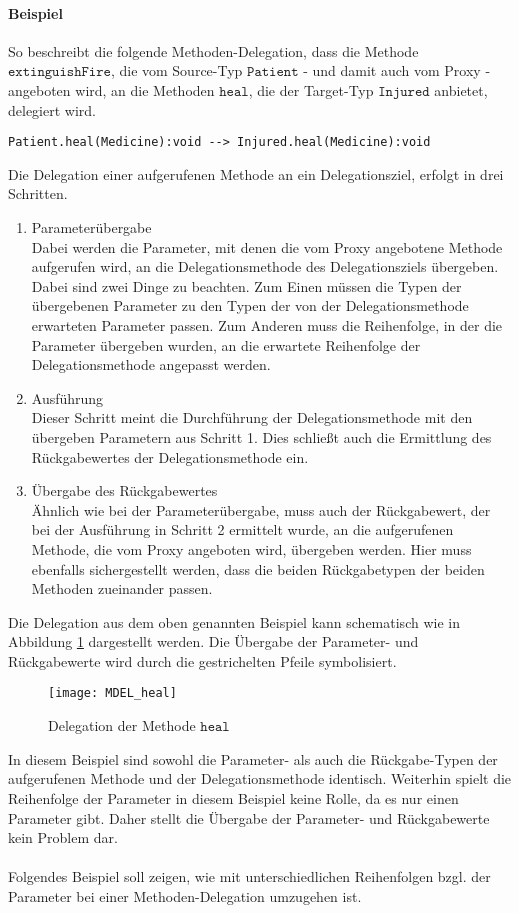 \paragraph{Beispiel} So beschreibt die folgende Methoden-Delegation, dass die Methode $\texttt{extinguishFire}$, die vom Source-Typ $\texttt{Patient}$ - und damit auch vom Proxy - angeboten wird, an die Methoden $\texttt{heal}$, die der Target-Typ $\texttt{Injured}$ anbietet, delegiert wird.
\begin{lstlisting}[style = dsl, caption = Einfache Methoden-Delegation, captionpos = b]
	Patient.heal(Medicine):void --> Injured.heal(Medicine):void
\end{lstlisting}
\noindent
Die Delegation einer aufgerufenen Methode an ein Delegationsziel, erfolgt in drei Schritten.
\begin{enumerate}
\item Parameterübergabe\\
Dabei werden die Parameter, mit denen die vom Proxy angebotene Methode aufgerufen wird, an die Delegationsmethode des Delegationsziels übergeben. Dabei sind zwei Dinge zu beachten. Zum Einen müssen die Typen der übergebenen Parameter zu den Typen der von der Delegationsmethode erwarteten Parameter passen. Zum Anderen muss die Reihenfolge, in der die Parameter übergeben wurden, an die erwartete Reihenfolge der Delegationsmethode angepasst werden.
\item Ausführung\\
Dieser Schritt meint die Durchführung der Delegationsmethode mit den übergeben Parametern aus Schritt 1. Dies schließt auch die Ermittlung des Rückgabewertes der Delegationsmethode ein.
\item Übergabe des Rückgabewertes\\
Ähnlich wie bei der Parameterübergabe, muss auch der Rückgabewert, der bei der Ausführung in Schritt 2 ermittelt wurde, an die aufgerufenen Methode, die vom Proxy angeboten wird, übergeben werden. Hier muss ebenfalls sichergestellt werden, dass die beiden Rückgabetypen der beiden Methoden zueinander passen.
\end{enumerate}
Die Delegation aus dem oben genannten Beispiel kann schematisch wie in Abbildung \ref{fig:DEL_heal} dargestellt werden. Die Übergabe der Parameter- und Rückgabewerte wird durch die gestrichelten Pfeile symbolisiert.
\begin{figure}[h!]
\texttt{[image: MDEL\_heal]}
\caption{Delegation der Methode $\texttt{heal}$}
\label{fig:DEL_heal}
\end{figure}
\noindent
In diesem Beispiel sind sowohl die Parameter- als auch die Rückgabe-Typen der aufgerufenen Methode und der Delegationsmethode identisch. Weiterhin spielt die Reihenfolge der Parameter in diesem Beispiel keine Rolle, da es nur einen Parameter gibt. Daher stellt die Übergabe der Parameter- und Rückgabewerte kein Problem dar.\\\\
Folgendes Beispiel soll zeigen, wie mit unterschiedlichen Reihenfolgen bzgl. der Parameter bei einer Methoden-Delegation umzugehen ist.
